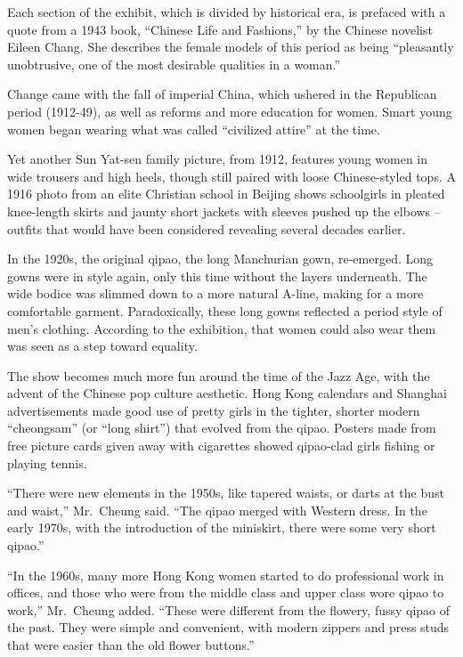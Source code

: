 ﻿\documentclass[12pt]{article}
\begin{document}
Each section of the exhibit, which is divided by historical era, is prefaced with a quote from a
1943 book, ``Chinese Life and Fashions,'' by the Chinese novelist Eileen Chang. She describes the
female models of this period as being ``pleasantly unobtrusive, one of the most desirable qualities
in a woman.''

Change came with the fall of imperial China, which ushered in the Republican period (1912-49), as
well as reforms and more education for women. Smart young women began wearing what was called
``civilized attire'' at the time.

Yet another Sun Yat-sen family picture, from 1912, features young women in wide trousers and high
heels, though still paired with loose Chinese-styled tops. A 1916 photo from an elite Christian
school in Beijing shows schoolgirls in pleated knee-length skirts and jaunty short jackets with
sleeves pushed up the elbows -- outfits that would have been considered revealing several decades
earlier.

In the 1920s, the original qipao, the long Manchurian gown, re-emerged. Long gowns were in style
again, only this time without the layers underneath. The wide bodice was slimmed down to a more
natural A-line, making for a more comfortable garment. Paradoxically, these long gowns reflected a
period style of men's clothing. According to the exhibition, that women could also wear them was
seen as a step toward equality.

The show becomes much more fun around the time of the Jazz Age, with the advent of the Chinese pop
culture aesthetic. Hong Kong calendars and Shanghai advertisements made good use of pretty girls in
the tighter, shorter modern ``cheongsam'' (or ``long shirt'') that evolved from the qipao. Posters
made from free picture cards given away with cigarettes showed qipao-clad girls fishing or playing
tennis.

``There were new elements in the 1950s, like tapered waists, or darts at the bust and waist,''
Mr.~Cheung said. ``The qipao merged with Western dress. In the early 1970s, with the introduction of
the miniskirt, there were some very short qipao.''

``In the 1960s, many more Hong Kong women started to do professional work in offices, and those who
were from the middle class and upper class wore qipao to work,'' Mr.~Cheung added. ``These were
different from the flowery, fussy qipao of the past. They were simple and convenient, with modern
zippers and press studs that were easier than the old flower buttons.''
\end{document}
